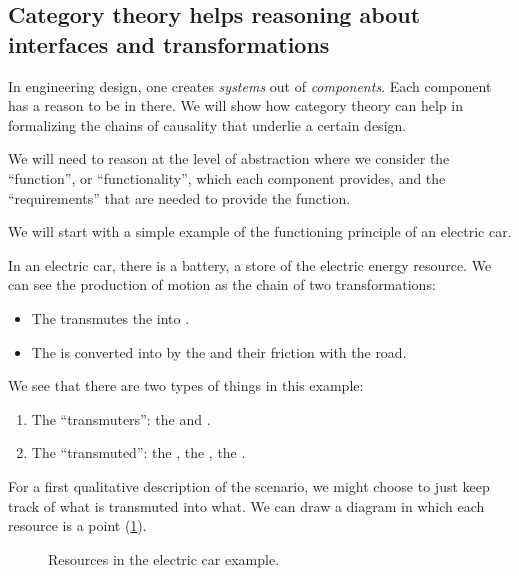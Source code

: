\subsection{Category theory helps reasoning about interfaces and transformations}



In engineering design, one creates \emph{systems} out of \emph{components}. Each component has a reason to be in there. We will show how category theory can help in formalizing the chains of causality that underlie a certain design. 

We will need to reason at the level of abstraction where we consider the ``function'', or ``functionality'', which each component provides, and the ``requirements'' that are needed to provide the function.

We will start with a simple example of the functioning principle of an electric car. 

In an electric car, there is a battery, a store of the electric energy resource. We can see the production of motion as the chain of two transformations:

\begin{itemize}
    \item The \motor transmutes the \electricpower into \rotationalmotion.
    \item The \rotationalmotion is converted into \translationalmotion by the \wheels and their friction with the road. 
\end{itemize}

We see that there are two types of things in this example:
\begin{enumerate}
    \item The ``transmuters'': the \motor and \wheels.
    \item The ``transmuted'': the \electricpower, the \rotationalmotion, the \translationalmotion.
\end{enumerate}

For a first qualitative description of the scenario, we might choose to just keep track of what is transmuted into what. We can draw a diagram in which each resource is a point (\cref{fig:e1}).

\begin{figure}[h!]
    \centering
    \caption{Resources in the electric car example. \label{fig:e1} }
\end{figure}



